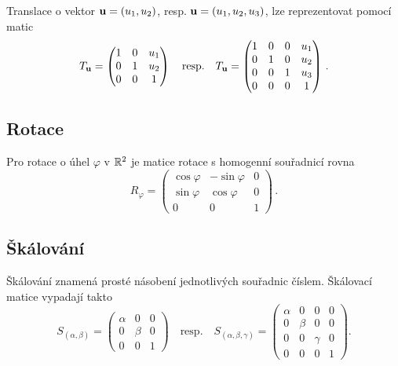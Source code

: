Translace o vektor $\mathbf{u} = (u_1, u_2)$, resp. $\mathbf{u} = (u_1, u_2, u_3)$, lze
reprezentovat pomocí matic
\[ T_{\mathbf{u} } =
	\begin{pmatrix}
		1 & 0 & u_1 \\
		0 & 1 & u_2 \\
		0 & 0 & 1
	\end{pmatrix}
	\quad \text{resp.} \quad
	T_{\mathbf{u} } =
	\begin{pmatrix}
		1 & 0 & 0 & u_1 \\
		0 & 1 & 0 & u_2 \\
		0 & 0 & 1 & u_3 \\
		0 & 0 & 0 & 1
	\end{pmatrix}\,. \]

\subsection*{Rotace}

Pro rotace o úhel $\varphi$ v $\mathbb{R}^2$ je matice rotace s homogenní souřadnicí
rovna
\[ R_\varphi =
	\begin{pmatrix}
		\cos\varphi & -\sin\varphi & 0 \\
		\sin\varphi & \cos\varphi  & 0 \\
		0           & 0            & 1
	\end{pmatrix}\,. \]

\subsection*{Škálování}

Škálování znamená prosté násobení jednotlivých souřadnic číslem. Škálovací matice vypadají takto
\[ S_{(\alpha, \beta)} =
	\begin{pmatrix}
		\alpha & 0     & 0 \\
		0      & \beta & 0 \\
		0      & 0     & 1
	\end{pmatrix}
	\quad \text{resp.} \quad
	S_{(\alpha, \beta, \gamma)} =
	\begin{pmatrix}
		\alpha & 0     & 0      & 0 \\
		0      & \beta & 0      & 0 \\
		0      & 0     & \gamma & 0 \\
		0      & 0     & 0      & 1
	\end{pmatrix}. \]

\pagebreak